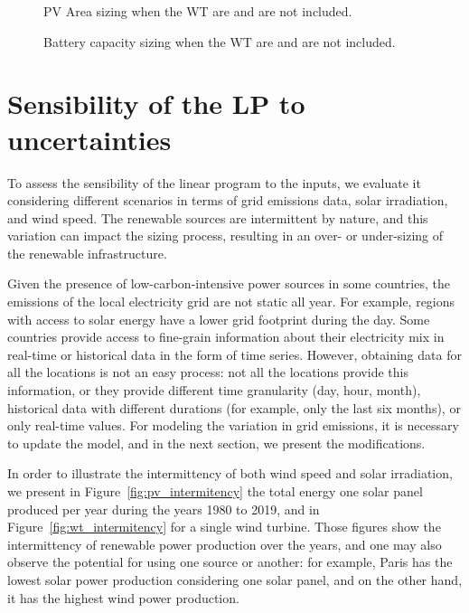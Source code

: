 \begin{figure}[h]
  \centering
  {}
  \caption{PV Area sizing when the WT are and are not included. }
  \label{fig:wind_pv}
\end{figure}


\begin{figure}[h]
  \centering
  {}
  \caption{Battery capacity sizing when the WT are and are not included. }
  \label{fig:wind_bat}

\end{figure}


\section{Sensibility of the LP to  uncertainties}
\label{sec:sensitivity}

To assess the sensibility of the linear program to the inputs, we evaluate it considering different scenarios in terms of grid emissions data, solar irradiation, and wind speed. The renewable sources are intermittent by nature, and this variation can impact the sizing process, resulting in an over- or under-sizing of the renewable infrastructure.

Given the presence of low-carbon-intensive power sources in some countries, the emissions of the local electricity grid are not static all year. For example, regions with access to solar energy have a lower grid footprint during the day. Some countries provide access to fine-grain information about their electricity mix in real-time or historical data in the form of time series. However, obtaining data for all the locations is not an easy process: not all the locations provide this information, or they provide different time granularity (day, hour, month), historical data with different durations (for example, only the last six months), or only real-time values. For modeling the variation in grid emissions, it is necessary to update the model, and in the next section, we present the modifications.


In order to illustrate the intermittency of both wind speed and solar irradiation, we present in Figure~\ref{fig:pv_intermitency} the total energy one solar panel produced per year during the years 1980 to 2019, and in Figure~\ref{fig:wt_intermitency} for a single wind turbine. Those figures show the intermittency of renewable power production over the years, and one may also observe the potential for using one source or another: for example, Paris has the lowest solar power production considering one solar panel, and on the other hand, it has the highest wind power production. 

